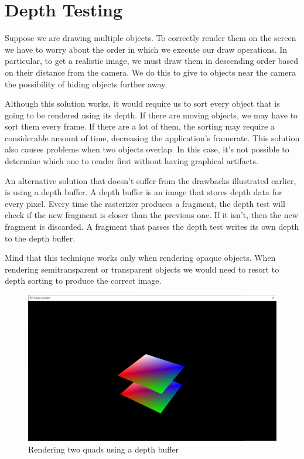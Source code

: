 \chapter{Depth Testing}
\label{chap:DepthTesting}

Suppose we are drawing multiple objects.
To correctly render them on the screen we have to worry about
the order in which we execute our draw operations.
In particular, to get a realistic image, we must draw
them in descending order based on their distance from the camera.
We do this to give to objects near the camera the possibility
of hiding objects further away.

Although this solution works, it would require us to sort
every object that is going to be rendered using its depth.
If there are moving objects, we may have to sort them every frame.
If there are a lot of them, the sorting may require a considerable
amount of time, decreasing the application's framerate.
This solution also causes problems when two objects overlap.
In this case, it's not possible to determine which one
to render first without having graphical artifacts.

An alternative solution that doesn't suffer from the drawbacks
illustrated earlier, is using a depth buffer.
A depth buffer is an image that stores depth data for every pixel.
Every time the rasterizer produces a fragment, the depth test will
check if the new fragment is closer than the previous one.
If it isn't, then the new fragment is discarded.
A fragment that passes the depth test writes its own depth to the
depth buffer.

Mind that this technique works only when rendering opaque objects.
When rendering semitransparent or transparent objects we would need
to resort to depth sorting to produce the correct image.

\begin{figure}[H]
    \centering
    \includegraphics[scale=0.20]{images/ChDepthTesting/DepthTesting.png}
    \caption{Rendering two quads using a depth buffer}
    \label{fig::DepthTesting}
\end{figure}

